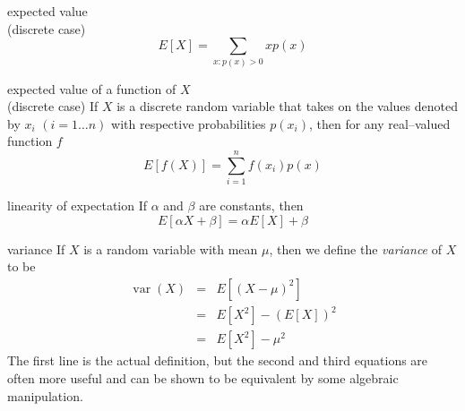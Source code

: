 \documentclass[avery5371,grid]{flashcards}
\DeclareMathOperator{\var}{var}
\begin{document}
\begin{flashcard}[Definition]{expected value \\(discrete case)}
\begin{displaymath}
E[X] = \sum_{x:p(x)>0} x p(x)
\end{displaymath}
\end{flashcard}

\begin{flashcard}[Proposition]{expected value of a function of $X$ \\ 
(discrete case)}
If $X$ is a discrete random variable that takes on the values denoted
by $x_i$ $(i=1\ldots n)$ with respective probabilities $p(x_i)$, then for
any real--valued function $f$
\begin{displaymath}
E[f(X)] = \sum_{i=1}^{n} f(x_i) p(x)
\end{displaymath}
\end{flashcard}

\begin{flashcard}[Corollary]{linearity of expectation}
If $\alpha$ and $\beta$ are constants, then
\begin{displaymath}
E[\alpha X + \beta] = \alpha E[X] + \beta
\end{displaymath}
\end{flashcard}

\begin{flashcard}{variance}
If $X$ is a random variable with mean $\mu$, then we define the
\textit{variance} of $X$ to be
\begin{eqnarray*}
\var(X) &=& E[(X-\mu)^2] \\
        &=& E[X^2] - (E[X])^2 \\
        &=& E[X^2] - \mu^2
\end{eqnarray*}
The first line is the actual definition, but the second and third
equations are often more useful and can be shown to be equivalent
by some algebraic manipulation.
\end{flashcard}
\end{document}
